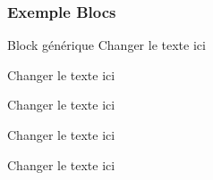 \documentclass[aspectratio=169]{beamer}
\begin{document}
\begin{frame}
    \frametitle{Exemple \og Blocs\fg}
    \begin{block}{Block générique}
        Changer le texte ici
    \end{block}
    \begin{blocDef}
        Changer le texte ici
    \end{blocDef}
    \begin{blocProp}
        Changer le texte ici
    \end{blocProp}
    \begin{blocEx}
        Changer le texte ici
    \end{blocEx}
    \begin{blocRem}
        Changer le texte ici
    \end{blocRem}
\end{frame}
\end{document}
